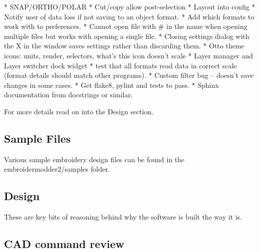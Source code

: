 \documentclass[11pt]{report}
\begin{document}
\begin{itemize}
* SNAP/ORTHO/POLAR
* Cut/copy allow post-selection
* Layout into config
* Notify user of data loss if not saving to an object format.
* Add which formats to work with to preferences.
* Cannot open file with \# in the name when opening multiple files but works with opening a single file.
* Closing settings dialog with the X in the window saves settings rather than discarding them.
* Otto theme icons: units, render, selectors, what's this icon doesn't scale
* Layer manager and Layer switcher dock widget
* test that all formats read data in correct scale (format details should match other programs).
* Custom filter bug -- doesn't save changes in some cases.
* Get flake8, pylint and tests to pass.
* Sphinx documentation from docstrings or similar.
\end{itemize}

For more details read on into the Design section.

\subsection{Sample Files}

Various sample embroidery design files can be found in the embroidermodder2/samples folder.

\subsection{Design}

These are key bits of reasoning behind why the software is built the way it is.

\subsection{CAD command review}

\end{document}
